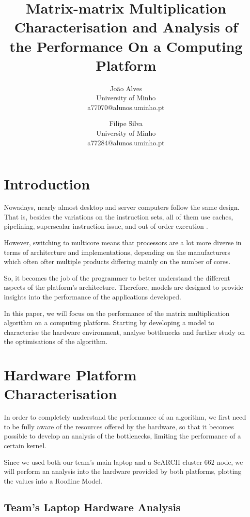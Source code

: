\documentclass[twoside,twocolumn]{article}
\title{Matrix-matrix Multiplication \\
    \large Characterisation and Analysis of the Performance On a Computing Platform} %
\author{
João Alves\\[1ex] %
\normalsize University of Minho \\ %
\normalsize a77070@alunos.uminho.pt %
\and %
Filipe Silva\\[1ex] %
\normalsize University of Minho \\ %
\normalsize a77284@alunos.uminho.pt %
}
\date{} %
\begin{document}
\maketitle


\section{Introduction}

Nowadays, nearly almost desktop and server computers follow the same design. That is, besides the variations on the instruction sets, all of them use caches, pipelining, superscalar instruction issue, and out-of-order execution \cite{roofline}.

However, switching to multicore means that processors are a lot more diverse in terms of architecture and implementations, depending on the manufacturers which often ofter multiple products differing mainly on the number of cores.

So, it becomes the job of the programmer to better understand the different aspects of the platform's architecture. Therefore, models are designed to provide insights into the performance of the applications developed.

In this paper, we will focus on the performance of the matrix multiplication algorithm on a computing platform. Starting by developing a model to characterise the hardware environment, analyse bottlenecks and further study on the optimisations of the algorithm.

\section{Hardware Platform Characterisation}

In order to completely understand the performance of an algorithm, we first need to be fully aware of the resources offered by the hardware, so that it becomes possible to develop an analysis of the bottlenecks, limiting the performance of a certain kernel.

Since we used both our team's main laptop and a SeARCH cluster 662 node, we will perform an analysis into the hardware provided by both platforms, plotting the values into a Roofline Model.


\subsection{Team's Laptop Hardware Analysis}
\end{document}
